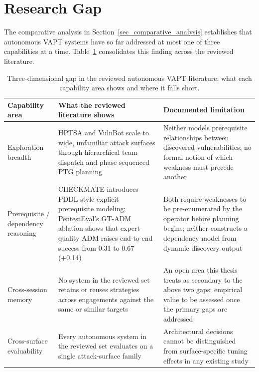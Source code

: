 \section{Research Gap}
\label{sec_research_gap}

The comparative analysis in Section~\ref{sec_comparative_analysis} establishes that autonomous VAPT systems have so far addressed at most one of three capabilities at a time. Table~\ref{tab:gap-table} consolidates this finding across the reviewed literature.

\begin{table}[htbp]
	\centering
	\small
	\caption{Three-dimensional gap in the reviewed autonomous VAPT literature: what each capability area shows and where it falls short.}
	\label{tab:gap-table}
	\begin{tabular}{@{}p{3.2cm}p{5.5cm}p{5.2cm}@{}}
		\toprule
		\textbf{Capability area}            & \textbf{What the reviewed literature shows}                                                                                                                                     & \textbf{Documented limitation}                                                                                                                           \\
		\midrule
		Exploration breadth                 & HPTSA and VulnBot scale to wide, unfamiliar attack surfaces through hierarchical team dispatch and phase-sequenced PTG planning                                                 & Neither models prerequisite relationships between discovered vulnerabilities; no formal notion of which weakness must precede another                    \\
		Prerequisite / dependency reasoning & CHECKMATE introduces PDDL-style explicit prerequisite modeling; PentestEval's GT-ADM ablation shows that expert-quality ADM raises end-to-end success from 0.31 to 0.67 (+0.14) & Both require weaknesses to be pre-enumerated by the operator before planning begins; neither constructs a dependency model from dynamic discovery output \\
		Cross-session memory                & No system in the reviewed set retains or reuses strategies across engagements against the same or similar targets                                                               & An open area this thesis treats as secondary to the above two gaps; empirical value to be assessed once the primary gaps are addressed                   \\
		Cross-surface evaluability          & Every autonomous system in the reviewed set evaluates on a single attack-surface family                                                                                         & Architectural decisions cannot be distinguished from surface-specific tuning effects in any existing study                                               \\
		\bottomrule
	\end{tabular}
\end{table}

